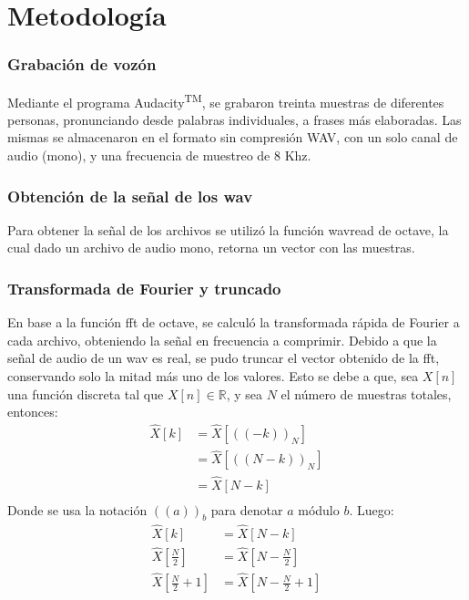 \documentclass[a4paper,11pt]{article}
\begin{document}
\section{Metodolog\'ia}

\subsubsection{Grabación de voz\'on}
Mediante el programa Audacity\textsuperscript{TM}, se grabaron treinta muestras
de diferentes personas, pronunciando desde palabras individuales, a frases más
elaboradas. Las mismas se almacenaron en el formato sin compresión WAV, con un
solo canal de audio (mono), y una frecuencia de muestreo de $8$ Khz.
\subsubsection{Obtención de la señal de los wav}
Para obtener la señal de los archivos se utilizó la función wavread de octave,
la cual dado un archivo de audio mono, retorna un vector con las muestras.
\subsubsection{Transformada de Fourier y truncado}
En base a la función fft de octave, se calculó la transformada rápida de
Fourier a cada archivo, obteniendo la señal en frecuencia a comprimir.
Debido a que la señal de audio de un wav es real, se pudo truncar el vector
obtenido de la fft, conservando solo la mitad más uno de los valores. Esto se
debe a que, sea $X[n]$ una función discreta tal que $X[n] \in
\mathbb{R}$, y sea $N$ el número de muestras totales, entonces:
\begin{equation} \label{eq1}
    \begin{split}
        \hat{X}[k] & = \hat{X}[((-k))_N] \\
         & = \hat{X}[((N - k))_N] \\
         & = \hat{X}[N-k] \\
     \end{split}
\end{equation}
Donde se usa la notación $((a))_b$ para denotar $a$ módulo $b$.
Luego:
\begin{equation} \label{eq2}
    \begin{split}
        \hat{X}[k] & = \hat{X}[N-k] \\
        \hat{X}[\frac{N}{2}] & = \hat{X}[N-\frac{N}{2}] \\
        \hat{X}[\frac{N}{2}+1] & = \hat{X}[N-\frac{N}{2}+1] \\
     \end{split}
\end{equation}
\end{document}
